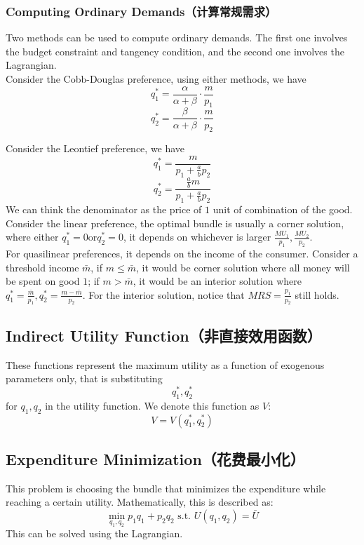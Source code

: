 \subsubsection{Computing Ordinary Demands（计算常规需求）}
Two methods can be used to compute ordinary demands. The first one involves the budget constraint and tangency condition, and the second one involves the Lagrangian. \\
Consider the Cobb-Douglas preference, using either methods, we have
$$q_1^{*} = \frac{\alpha}{\alpha + \beta} \cdot \frac{m}{p_1}$$
$$q_2^{*} = \frac{\beta}{\alpha + \beta} \cdot \frac{m}{p_2}$$

Consider the Leontief preference, we have
$$q_1^{*} = \frac{m}{p_1 + \frac{a}{b}p_2}$$
$$q_2^{*} = \frac{\frac{a}{b}m}{p_1 + \frac{a}{b}p_2}$$
We can think the denominator as the price of $1$ unit of combination of the good. \\
Consider the linear preference, the optimal bundle is usually a corner solution, where either $q_1^{*} = 0 \text{or} q_2^{*} = 0$, it depends on whichever is larger $\frac{MU_1}{p_1}, \frac{MU_2}{p_2}$. \\
For quasilinear preferences, it depends on the income of the consumer. Consider a threshold income $\bar{m}$, if $m \le \bar{m}$, it would be corner solution where all money will be spent on good $1$; if $m > \bar{m}$, it would be an interior solution where $q_1^{*} = \frac{\bar{m}}{p_1}, q_2^{*} = \frac{m - \bar{m}}{p_2}$. For the interior solution, notice that $MRS = \frac{p_1}{p_2}$ still holds.

\subsection{Indirect Utility Function（非直接效用函数）}
These functions represent the maximum utility as a function of exogenous parameters only, that is substituting $$q_1^{*}, q_2^{*}$$ for $q_1, q_2$ in the utility function. We denote this function as $V$:
$$V = V(q_1^{*}, q_2^{*})$$

\subsection{Expenditure Minimization（花费最小化）}
This problem is choosing the bundle that minimizes the expenditure while reaching a certain utility. Mathematically, this is described as:
$$\min_{q_1, q_2}p_1q_1 + p_2q_2 \text{ s.t. } U(q_1, q_2) = \bar{U}$$
This can be solved using the Lagrangian.

\newpage